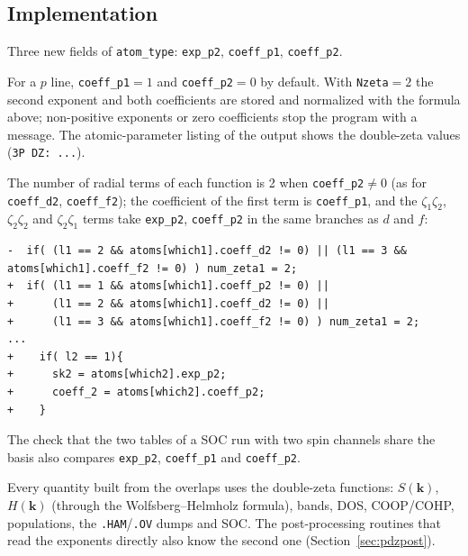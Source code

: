 \documentclass[11pt,a4paper]{article}
\newcommand{\file}[1]{\texttt{#1}}
\newcommand{\fn}[1]{\texttt{#1()}}
\newcommand{\var}[1]{\texttt{#1}}
\begin{document}
\subsection{Implementation}
\begin{description}[style=nextline,leftmargin=1.2em]
\item[\file{bind.h}] Three new fields of \var{atom\_type}: \var{exp\_p2}, \var{coeff\_p1},
  \var{coeff\_p2}.
\item[\file{fileio.c}, \fn{fill\_atomic\_parms}] For a $p$ line, \var{coeff\_p1}$=1$ and
  \var{coeff\_p2}$=0$ by default. With \texttt{Nzeta}$=2$ the second exponent and both
  coefficients are stored and normalized with the formula above; non-positive exponents or
  zero coefficients stop the program with a message. The atomic-parameter listing of the
  output shows the double-zeta values (\texttt{3P DZ: ...}).
\item[\file{mov.c}, \fn{mov}] The number of radial terms of each function is 2 when
  \var{coeff\_p2}$\neq0$ (as for \var{coeff\_d2}, \var{coeff\_f2}); the coefficient of the
  first term is \var{coeff\_p1}, and the $\zeta_1\zeta_2$, $\zeta_2\zeta_2$ and
  $\zeta_2\zeta_1$ terms take \var{exp\_p2}, \var{coeff\_p2} in the same branches as $d$ and
  $f$:
\begin{lstlisting}[style=diff]
-  if( (l1 == 2 && atoms[which1].coeff_d2 != 0) || (l1 == 3 && atoms[which1].coeff_f2 != 0) ) num_zeta1 = 2;
+  if( (l1 == 1 && atoms[which1].coeff_p2 != 0) ||
+      (l1 == 2 && atoms[which1].coeff_d2 != 0) ||
+      (l1 == 3 && atoms[which1].coeff_f2 != 0) ) num_zeta1 = 2;
...
+    if( l2 == 1){
+      sk2 = atoms[which2].exp_p2;
+      coeff_2 = atoms[which2].coeff_p2;
+    }
\end{lstlisting}
\item[\file{soc.c}] The check that the two tables of a SOC run with two spin channels
  share the basis also compares \var{exp\_p2}, \var{coeff\_p1} and \var{coeff\_p2}.
\end{description}
Every quantity built from the overlaps uses the double-zeta functions: $S(\mathbf{k})$,
$H(\mathbf{k})$ (through the Wolfsberg--Helmholz formula), bands, DOS, COOP/COHP,
populations, the \texttt{.HAM}/\texttt{.OV} dumps and SOC. The post-processing routines that
read the exponents directly also know the second one (Section~\ref{sec:pdzpost}).
\end{document}
